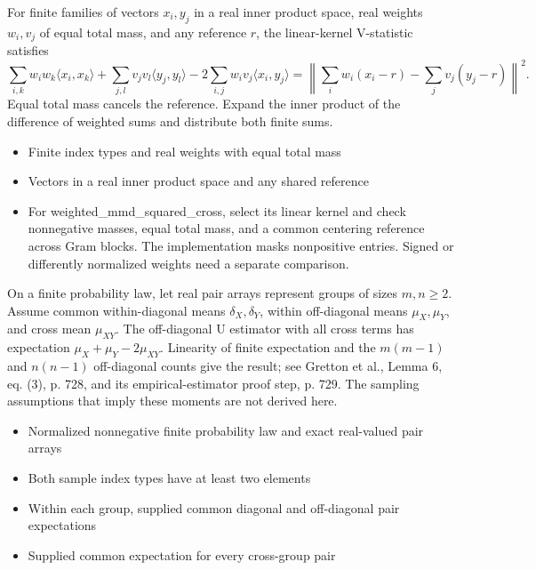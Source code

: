 \expandafter\def\csname statadic@statement@STATADIC-MMD-002\endcsname{For finite families of vectors $x_i,y_j$ in a real inner
  product space, real weights $w_i,v_j$ of equal total mass, and any reference
  $r$, the linear-kernel V-statistic satisfies
  \[
  \sum_{i,k}w_iw_k\langle x_i,x_k\rangle+
  \sum_{j,l}v_jv_l\langle y_j,y_l\rangle-
   2\sum_{i,j}w_iv_j\langle x_i,y_j\rangle=
  \left\|\sum_i w_i(x_i-r)-\sum_jv_j(y_j-r)\right\|^2.
  \]}
\expandafter\def\csname statadic@proof@STATADIC-MMD-002\endcsname{Equal total mass cancels the reference. Expand the inner
  product of the difference of weighted sums and distribute both finite sums.}
\expandafter\def\csname statadic@assumptions@STATADIC-MMD-002\endcsname{\begin{itemize}
\item Finite index types and real weights with equal total mass
\item Vectors in a real inner product space and any shared reference
\end{itemize}}
\expandafter\def\csname statadic@diagnostics@STATADIC-MMD-002\endcsname{\begin{itemize}
\item For weighted\_mmd\_squared\_cross, select its linear kernel and check nonnegative masses, equal total mass, and a common centering reference across Gram blocks. The implementation masks nonpositive entries. Signed or differently normalized weights need a separate comparison.
\end{itemize}}
\expandafter\def\csname statadic@statement@STATADIC-MMD-001\endcsname{On a finite probability law, let real pair arrays represent
  groups of sizes $m,n\geq2$. Assume common within-diagonal means
  $\delta_X,\delta_Y$, within off-diagonal means
  $\mu_X,\mu_Y$, and cross mean $\mu_{XY}$. The off-diagonal U estimator with
  all cross terms has expectation $\mu_X+\mu_Y-2\mu_{XY}$.}
\expandafter\def\csname statadic@proof@STATADIC-MMD-001\endcsname{Linearity of finite expectation and the $m(m-1)$ and $n(n-1)$
  off-diagonal counts give the result; see Gretton et al., Lemma 6, eq. (3),
  p. 728, and its empirical-estimator proof step, p. 729.
  The sampling assumptions that imply these moments are not derived here.}
\expandafter\def\csname statadic@assumptions@STATADIC-MMD-001\endcsname{\begin{itemize}
\item Normalized nonnegative finite probability law and exact real-valued pair arrays
\item Both sample index types have at least two elements
\item Within each group, supplied common diagonal and off-diagonal pair expectations
\item Supplied common expectation for every cross-group pair
\end{itemize}}
